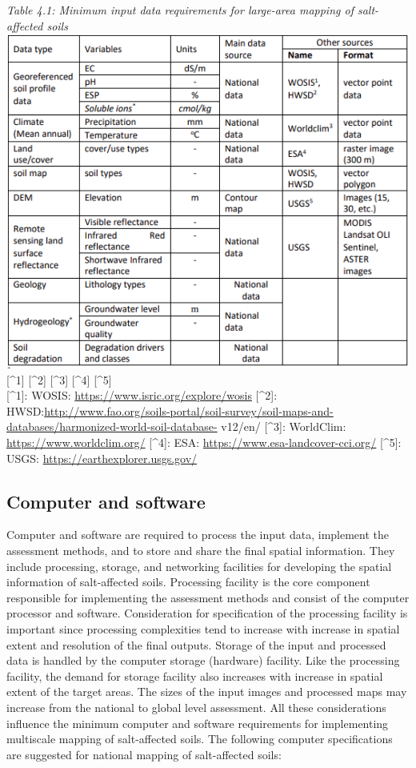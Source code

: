 \documentclass[
  10pt,
  b5paper,
]{book}
\begin{document}
\emph{Table 4.1: Minimum input data requirements for large-area mapping of salt-affected soils}
\includegraphics{figures/tables/Table_4.1.PNG}\\
{[}\^{}1{]} {[}\^{}2{]} {[}\^{}3{]} {[}\^{}4{]} {[}\^{}5{]}\\
{[}\^{}1{]}: WOSIS: \url{https://www.isric.org/explore/wosis}
{[}\^{}2{]}: HWSD:\url{http://www.fao.org/soils-portal/soil-survey/soil-maps-and-databases/harmonized-world-soil-database-}
v12/en/
{[}\^{}3{]}: WorldClim: \url{https://www.worldclim.org/}
{[}\^{}4{]}: ESA: \url{https://www.esa-landcover-cci.org/}
{[}\^{}5{]}: USGS: \url{https://earthexplorer.usgs.gov/}

\hypertarget{computer-and-software}{%
\subsection{Computer and software}\label{computer-and-software}}

Computer and software are required to process the input data, implement the assessment methods, and to store and share the final spatial information. They include processing, storage, and networking facilities for developing the spatial information of salt-affected soils. Processing facility is the core component responsible for implementing the assessment methods and consist of the computer processor and software. Consideration for specification of the processing facility is important since processing complexities tend to increase with increase in spatial extent and resolution of the final outputs. Storage of the input and processed data is handled by the computer storage (hardware) facility. Like the processing facility, the demand for storage facility also increases with increase in spatial extent of the target areas. The sizes of the input images and processed maps may increase from the national to global level assessment. All these considerations influence the minimum computer and software requirements for implementing multiscale mapping of salt-affected soils. The following computer specifications are suggested for national mapping of salt-affected soils:
\end{document}
